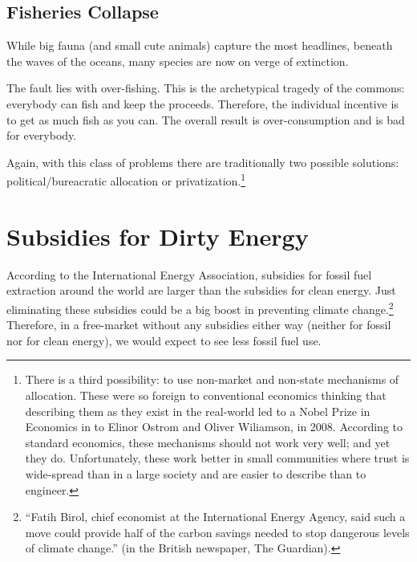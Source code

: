 
\subsection{Fisheries Collapse}

While big fauna (and small cute animals) capture the most headlines, beneath
the waves of the oceans, many species are now on verge of extinction.

The fault lies with over-fishing. This is the archetypical tragedy of the
commons: everybody can fish and keep the proceeds. Therefore, the individual
incentive is to get as much fish as you can. The overall result is
over-consumption and is bad for everybody.

Again, with this class of problems there are traditionally two possible
solutions: political/bureacratic allocation or privatization.\footnote{There
is a third possibility: to use non-market and non-state mechanisms of
allocation. These were so foreign to conventional economics thinking that
describing them as they exist in the real-world led to a Nobel Prize in
Economics in to Elinor Ostrom and Oliver Wiliamson, in 2008. According to
standard economics, these mechanisms should not work very well; and yet they
do. Unfortunately, these work better in small communities where trust is
wide-spread than in a large society and are easier to describe than to
engineer.}

\section{Subsidies for Dirty Energy}

According to the International Energy Association, subsidies for fossil fuel
extraction around the world are larger than the subsidies for clean energy.
Just eliminating these subsidies could be a big boost in preventing climate
change.\footnote{``Fatih Birol, chief
economist at the International Energy Agency, said such a move could
provide half of the carbon savings needed to stop dangerous levels of climate
change.'' (in the British newspaper, The Guardian).%
} Therefore, in a free-market without any subsidies either way (neither for
fossil nor for clean energy), we would expect to see less fossil fuel use.


